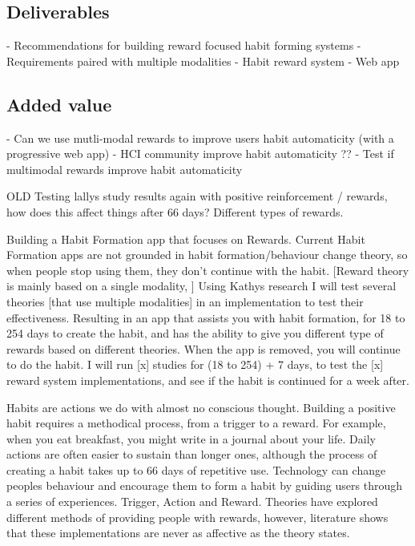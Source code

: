 \subsection{Deliverables}
  - Recommendations for building reward focused habit forming systems\newline
    - Requirements paired with multiple modalities\newline
  - Habit reward system\newline
    - Web app

\subsection{Added value}
  - Can we use mutli-modal rewards to improve users habit automaticity (with a progressive web app)\newline
    - HCI community improve habit automaticity ??\newline
    - Test if multimodal rewards improve habit automaticity


OLD\tabularnewline
\tabularnewline
Testing lallys study results again with positive reinforcement / rewards, how does this affect things after 66 days? Different types of rewards.\newline

Building a Habit Formation app that focuses on Rewards. Current Habit Formation apps are not grounded in habit formation/behaviour change theory, so when people stop using them, they don't continue with the habit. [Reward theory is mainly based on a single modality, ] Using Kathys research I will test several theories [that use multiple modalities] in an implementation to test their effectiveness. Resulting in an app that assists you with habit formation, for 18 to 254 days to create the habit, and has the ability to give you different type of rewards based on different theories. When the app is removed, you will continue to do the habit. I will run [x] studies for (18 to 254) + 7 days, to test the [x] reward system implementations, and see if the habit is continued for a week after.\newline

Habits are actions we do with almost no conscious thought. Building a positive habit requires a methodical process, from a trigger to a reward. For example, when you eat breakfast, you might write in a journal about your life. Daily actions are often easier to sustain than longer ones, although the process of creating a habit takes up to 66 days of repetitive use. Technology can change peoples behaviour and encourage them to form a habit by guiding users through a series of experiences. Trigger, Action and Reward. Theories have explored different methods of providing people with rewards, however, literature shows that these implementations are never as affective as the theory states.\newline

